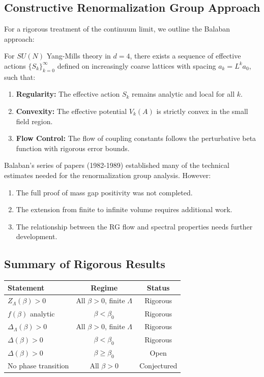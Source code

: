 \subsection{Constructive Renormalization Group Approach}

For a rigorous treatment of the continuum limit, we outline the Balaban approach:

\begin{theorem}
\label{thm:balaban-statement}
For $SU(N)$ Yang-Mills theory in $d=4$, there exists a sequence of effective actions $\{S_k\}_{k=0}^{\infty}$ defined on increasingly coarse lattices with spacing $a_k = L^k a_0$, such that:
\begin{enumerate}
    \item \textbf{Regularity:} The effective action $S_k$ remains analytic and local for all $k$.
    \item \textbf{Convexity:} The effective potential $V_k(A)$ is strictly convex in the small field region.
    \item \textbf{Flow Control:} The flow of coupling constants follows the perturbative beta function with rigorous error bounds.
\end{enumerate}
\end{theorem}

\begin{remark}
Balaban's series of papers (1982-1989) established many of the technical estimates needed for the renormalization group analysis. However:
\begin{enumerate}
    \item The full proof of mass gap positivity was not completed.
    \item The extension from finite to infinite volume requires additional work.
    \item The relationship between the RG flow and spectral properties needs further development.
\end{enumerate}
\end{remark}

\subsection{Summary of Rigorous Results}

\begin{center}
\begin{tabular}{|l|c|c|}
\hline
\textbf{Statement} & \textbf{Regime} & \textbf{Status} \\
\hline
$Z_\Lambda(\beta) > 0$ & All $\beta > 0$, finite $\Lambda$ & Rigorous \\
$f(\beta)$ analytic & $\beta < \beta_0$ & Rigorous \\
$\Delta_\Lambda(\beta) > 0$ & All $\beta > 0$, finite $\Lambda$ & Rigorous \\
$\Delta(\beta) > 0$ & $\beta < \beta_0$ & Rigorous \\
$\Delta(\beta) > 0$ & $\beta \geq \beta_0$ & Open \\
No phase transition & All $\beta > 0$ & Conjectured \\
\hline
\end{tabular}
\end{center}
